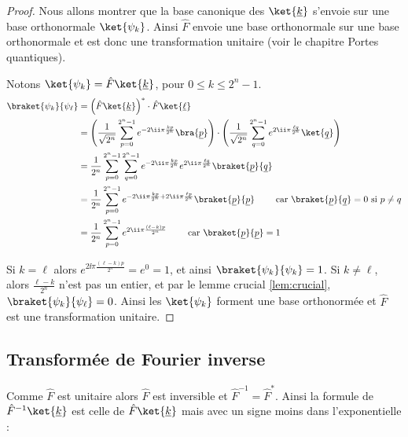 \documentclass[11pt,class=report,crop=false]{standalone}
\begin{document}
\begin{proof}
Nous allons montrer que la base canonique des $\ket{\underline{k}}$ s'envoie sur une base orthonormale $\ket{\psi_k}$. Ainsi $\hat F$ envoie une base orthonormale sur une base orthonormale et est donc une transformation unitaire (voir le chapitre \og{}Portes quantiques\fg{}).

Notons $\ket{\psi_k} = \hat F \ket{\underline k}$, pour $0\le k \le 2^n-1$.
\begin{align*}
\braket{\psi_k}{\psi_\ell} 
  &= \left( \hat F \ket{\underline{k}} \right)^* \cdot\hat F \ket{\underline{\ell}} \\
  &= \left(\frac{1}{\sqrt{2^n}} \sum_{p=0}^{2^n-1} e^{-2\ii \pi \frac{kp}{2^n}} \bra{\underline p}\right)
     \cdot\left(  \frac{1}{\sqrt{2^n}}  \sum_{q=0}^{2^n-1} e^{2\ii \pi \frac{\ell q}{2^n}} \ket{\underline q}\right) \\
  &= \frac{1}{2^n} \sum_{p=0}^{2^n-1}\sum_{q=0}^{2^n-1}e^{-2\ii \pi \frac{kp}{2^n}}e^{2\ii \pi \frac{\ell q}{2^n}} \braket{\underline p}{\underline q} \\
  &= \frac{1}{2^n} \sum_{p=0}^{2^n-1}e^{-2\ii \pi \frac{kp}{2^n}+2\ii \pi \frac{\ell p}{2^n}} \braket{\underline p}{\underline p} \qquad \text{ car } \braket{\underline p}{\underline q}=0 \text{ si } p \neq q \\
  &= \frac{1}{2^n} \sum_{p=0}^{2^n-1}e^{2\ii \pi \frac{(\ell-k)p}{2^n}} \qquad \text{ car } \braket{\underline p}{\underline p}=1 \\
\end{align*}

Si $k=\ell$ alors $e^{2\ii \pi \frac{(\ell-k)p}{2^n}}=e^0=1$, et ainsi $\braket{\psi_k}{\psi_k} = 1$. Si $k \neq \ell$, alors $\frac{\ell-k}{2^n}$ n'est pas un entier, et par le lemme crucial \ref{lem:crucial},
$\braket{\psi_k}{\psi_\ell} = 0$.
Ainsi les $\ket{\psi_k}$ forment une base orthonormée et $\hat F$ est une transformation unitaire.
\end{proof}

\subsection{Transformée de Fourier inverse}

Comme $\hat F$ est unitaire alors $\hat F$ est inversible et ${\hat F}^{-1} = {\hat F}^*$.
Ainsi la formule de ${\hat F}^{-1}\ket{\underline k}$ est celle de $\hat F \ket{\underline k}$ mais avec un signe moins dans l'exponentielle :
\end{document}
